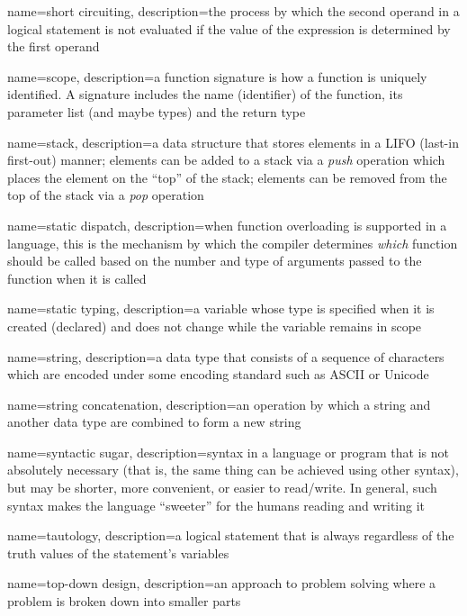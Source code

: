 {
  name=short circuiting,
  description={the process by which the second operand in a logical statement is not evaluated if the
  	value of the expression is determined by the first operand}
}

{
  name=scope,
  description={a function signature is how a function is uniquely identified.  A signature includes the name (identifier) of the function, its parameter list (and maybe types) and the return type}
}

{
  name=stack,
  description={a data structure that stores elements in a LIFO (last-in first-out) manner; elements can be added to a stack via a \emph{push} operation which places the element on the ``top'' of the stack; elements can be removed from the top of the stack via a \emph{pop} operation}
}

{
  name=static dispatch,
  description={when function overloading is supported in a language, this is the mechanism by which the compiler determines \emph{which} function should be called based on the number and type of arguments passed to the function when it is called}
}

{
  name=static typing,
  description={a variable whose type is specified when it is created (declared) and does not change while the
  	variable remains in scope}
}

{
  name=string,
  description={a data type that consists of a sequence of characters which are encoded under some encoding standard such as ASCII or Unicode}
}

{
  name=string concatenation,
  description={an operation by which a string and another data type are combined to form a new string}
}

{
  name=syntactic sugar,
  description={syntax in a language or program that is not absolutely necessary (that is, the
  	same thing can be achieved using other syntax), but may be shorter, more convenient, or
	easier to read/write.  In general, such syntax makes the language ``sweeter'' for the
	humans reading and writing it}
}

{
  name=tautology,
  description={a logical statement that is always \True regardless of the truth values of the statement's variables}
}

{
  name=top-down design,
  description={an approach to problem solving where a problem is broken down into smaller parts}
}

